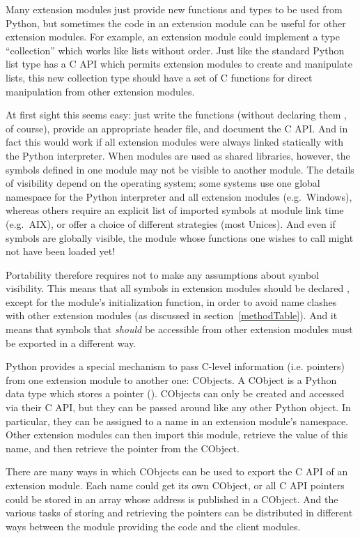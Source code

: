 \documentclass{manual}
\begin{document}
Many extension modules just provide new functions and types to be
used from Python, but sometimes the code in an extension module can
be useful for other extension modules. For example, an extension
module could implement a type ``collection'' which works like lists
without order. Just like the standard Python list type has a C API
which permits extension modules to create and manipulate lists, this
new collection type should have a set of C functions for direct
manipulation from other extension modules.

At first sight this seems easy: just write the functions (without
declaring them , of course), provide an appropriate
header file, and document the C API. And in fact this would work if
all extension modules were always linked statically with the Python
interpreter. When modules are used as shared libraries, however, the
symbols defined in one module may not be visible to another module.
The details of visibility depend on the operating system; some systems
use one global namespace for the Python interpreter and all extension
modules (e.g.\ Windows), whereas others require an explicit list of
imported symbols at module link time (e.g.\ AIX), or offer a choice of
different strategies (most Unices). And even if symbols are globally
visible, the module whose functions one wishes to call might not have
been loaded yet!

Portability therefore requires not to make any assumptions about
symbol visibility. This means that all symbols in extension modules
should be declared , except for the module's
initialization function, in order to avoid name clashes with other
extension modules (as discussed in section~\ref{methodTable}). And it
means that symbols that \emph{should} be accessible from other
extension modules must be exported in a different way.

Python provides a special mechanism to pass C-level information (i.e.
pointers) from one extension module to another one: CObjects.
A CObject is a Python data type which stores a pointer ().  CObjects can only be created and accessed via their C API, but
they can be passed around like any other Python object. In particular, 
they can be assigned to a name in an extension module's namespace.
Other extension modules can then import this module, retrieve the
value of this name, and then retrieve the pointer from the CObject.

There are many ways in which CObjects can be used to export the C API
of an extension module. Each name could get its own CObject, or all C
API pointers could be stored in an array whose address is published in
a CObject. And the various tasks of storing and retrieving the pointers
can be distributed in different ways between the module providing the
code and the client modules.
\end{document}
